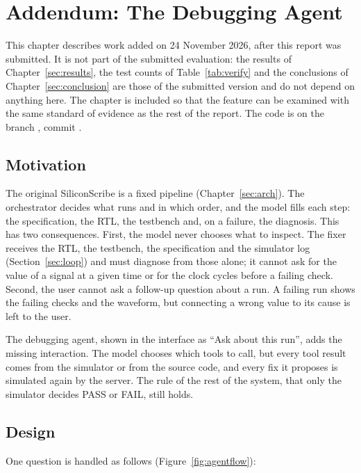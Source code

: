 \chapter{Addendum: The Debugging Agent}
\label{sec:addendum}

This chapter describes work added on 24 November 2026, after this report was
submitted. It is not part of the submitted evaluation: the results of
Chapter~\ref{sec:results}, the test counts of Table~\ref{tab:verify} and the
conclusions of Chapter~\ref{sec:conclusion} are those of the submitted version and do
not depend on anything here. The chapter is included so that the feature can be
examined with the same standard of evidence as the rest of the report. The code is on
the branch , commit .

\section{Motivation}
\label{sec:agentmotiv}
The original SiliconScribe is a fixed pipeline (Chapter~\ref{sec:arch}). The
orchestrator decides what runs and in which order, and the model fills each step:
the specification, the RTL, the testbench and, on a failure, the diagnosis. This has
two consequences. First, the model never chooses what to inspect. The fixer receives
the RTL, the testbench, the specification and the simulator log
(Section~\ref{sec:loop}) and must diagnose from those alone; it cannot ask for the
value of a signal at a given time or for the clock cycles before a failing check.
Second, the user cannot ask a follow-up question about a run. A failing run shows the
failing checks and the waveform, but connecting a wrong value to its cause is left to
the user.

The debugging agent, shown in the interface as ``Ask about this run'', adds the
missing interaction. The model chooses which tools to call, but every tool result
comes from the simulator or from the source code, and every fix it proposes is
simulated again by the server. The rule of the rest of the system, that only the
simulator decides PASS or FAIL, still holds.

\section{Design}
\label{sec:agentdesign}
One question is handled as follows (Figure~\ref{fig:agentflow}):

